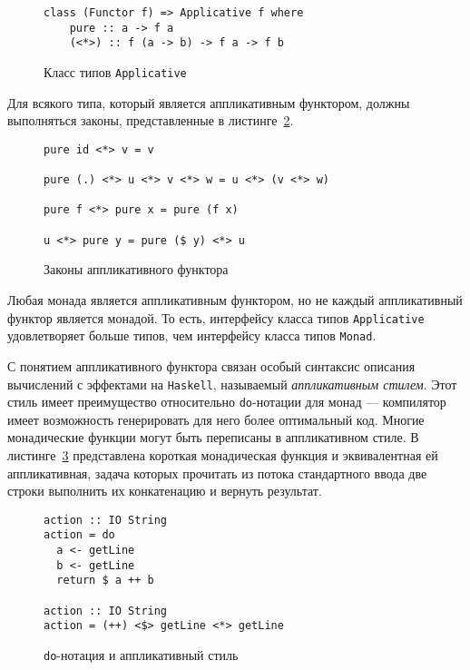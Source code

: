\begin{figure}[h]
\begin{lstlisting}
class (Functor f) => Applicative f where
    pure :: a -> f a
    (<*>) :: f (a -> b) -> f a -> f b
\end{lstlisting}
\caption{Класс типов \lstinline{Applicative}}
\label{listing:Applicative}
\end{figure}

Для всякого типа, который является аппликативным функтором, должны выполняться
законы, представленные в листинге~\ref{listing:ApplicativeLaws}.

\begin{figure}[h]
\begin{lstlisting}
pure id <*> v = v

pure (.) <*> u <*> v <*> w = u <*> (v <*> w)

pure f <*> pure x = pure (f x)

u <*> pure y = pure ($ y) <*> u
\end{lstlisting}
\caption{Законы аппликативного функтора}
\label{listing:ApplicativeLaws}
\end{figure}

Любая монада является аппликативным функтором, но не каждый аппликативный
функтор является монадой. То есть, интерфейсу класса типов
\lstinline{Applicative} удовлетворяет больше типов, чем интерфейсу класса типов
\lstinline{Monad}.

С понятием аппликативного функтора связан особый синтаксис описания вычислений с
эффектами на \lstinline{Haskell}, называемый \emph{аппликативным стилем}. Этот
стиль имеет преимущество относительно \lstinline{do}-нотации для монад ---
компилятор имеет возможность генерировать для него более оптимальный код.
Многие монадические функции могут быть переписаны в аппликативном стиле.
В листинге~\ref{listing:MonadApplicative} представлена короткая монадическая
функция и эквивалентная ей аппликативная, задача которых прочитать из потока
стандартного ввода две строки выполнить их конкатенацию и вернуть результат.

\begin{figure}
\begin{lstlisting}
action :: IO String
action = do
  a <- getLine
  b <- getLine
  return $ a ++ b

action :: IO String
action = (++) <$> getLine <*> getLine
\end{lstlisting}
\caption{\lstinline{do}-нотация и аппликативный стиль}
\label{listing:MonadApplicative}
\end{figure}

